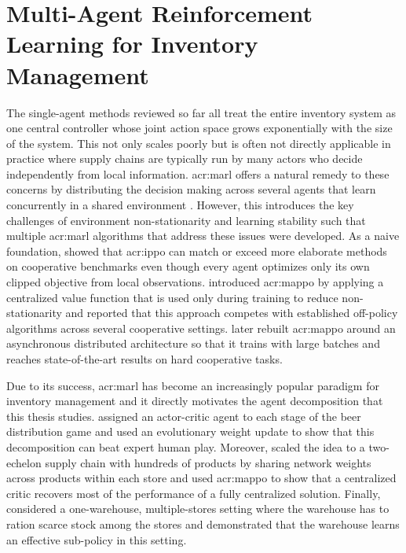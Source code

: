 \section{Multi-Agent Reinforcement Learning for Inventory Management}
\label{sec:rw-marl}
The single-agent methods reviewed so far all treat the entire inventory system as one central controller whose joint action space grows exponentially with the size of the system. This not only scales poorly but is often not directly applicable in practice where supply chains are typically run by many actors who decide independently from local information. \gls{acr:marl} offers a natural remedy to these concerns by distributing the decision making across several agents that learn concurrently in a shared environment \citep{Stefanomarlbook}. However, this introduces the key challenges of environment non-stationarity and learning stability such that multiple \gls{acr:marl} algorithms that address these issues were developed. As a naive foundation, \citet{dewitt2020independent} showed that \gls{acr:ippo} can match or exceed more elaborate methods on cooperative benchmarks even though every agent optimizes only its own clipped objective from local observations. \citet{yu2022surprising} introduced \gls{acr:mappo} by applying a centralized value function that is used only during training to reduce non-stationarity and reported that this approach competes with established off-policy algorithms across several cooperative settings. \citet{fu2021asyncmappo} later rebuilt \gls{acr:mappo} around an asynchronous distributed architecture so that it trains with large batches and reaches state-of-the-art results on hard cooperative tasks.

Due to its success, \gls{acr:marl} has become an increasingly popular paradigm for inventory management and it directly motivates the agent decomposition that this thesis studies. \citet{fuji2018dwe} assigned an actor-critic agent to each stage of the beer distribution game and used an evolutionary weight update to show that this decomposition can beat expert human play. Moreover, \citet{sultana2020reinforcement} scaled the idea to a two-echelon supply chain with hundreds of products by sharing network weights across products within each store and \citet{mousa2024analysis} used \gls{acr:mappo} to show that a centralized critic recovers most of the performance of a fully centralized solution. Finally, \citet{khirwar2023cooperative} considered a one-warehouse, multiple-stores setting where the warehouse has to ration scarce stock among the stores and demonstrated that the warehouse learns an effective sub-policy in this setting.  

